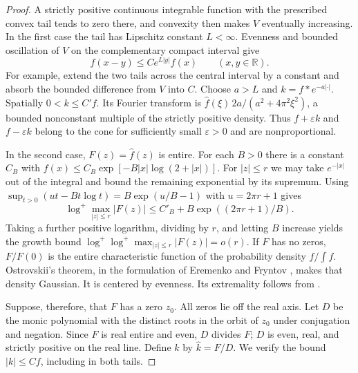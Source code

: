 \documentclass[11pt,a4paper]{article}
\numberwithin{equation}{section}
\begin{document}
\begin{proof}
A strictly positive continuous integrable function with the prescribed convex tail tends to zero there, and convexity then makes $V$ eventually increasing. In the first case the tail has Lipschitz constant $L<\infty$. Evenness and bounded oscillation of $V$ on the complementary compact interval give
\[
 f(x-y)\le C e^{L|y|} f(x)\qquad(x,y\in\mathbb R).
\]
For example, extend the two tails across the central interval by a constant and absorb the bounded difference from $V$ into $C$. Choose $a>L$ and $k=f*e^{-a|\cdot|}$. Spatially $0<k\le C' f$. Its Fourier transform is $\widehat f(\xi)\,2a/(a^2+4\pi^2\xi^2)$, a bounded nonconstant multiple of the strictly positive density. Thus $f+\varepsilon k$ and $f-\varepsilon k$ belong to the cone for sufficiently small $\varepsilon>0$ and are nonproportional.

In the second case, $F(z)=\widehat f(z)$ is entire. For each $B>0$ there is a constant $C_B$ with $f(x)\le C_B\exp[-B|x|\log(2+|x|)]$. For $|z|\le r$ we may take $e^{-|x|}$ out of the integral and bound the remaining exponential by its supremum. Using $\sup_{t>0}(ut-Bt\log t)=B\exp(u/B-1)$ with $u=2\pi r+1$ gives
\[
 \log^+\max_{|z|\le r}|F(z)|\le C'_B+B\exp((2\pi r+1)/B).
\]
Taking a further positive logarithm, dividing by $r$, and letting $B$ increase yields the growth bound $\log^+\log^+\max_{|z|\le r}|F(z)|=o(r)$. If $F$ has no zeros, $F/F(0)$ is the entire characteristic function of the probability density $f/\int f$. Ostrovskii's theorem, in the formulation of Eremenko and Fryntov \cite{EF}, makes that density Gaussian. It is centered by evenness. Its extremality follows from \cite[Sec.~4.2]{JMR2009}.

Suppose, therefore, that $F$ has a zero $z_0$. All zeros lie off the real axis. Let $D$ be the monic polynomial with the distinct roots in the orbit of $z_0$ under conjugation and negation. Since $F$ is real entire and even, $D$ divides $F$; $D$ is even, real, and strictly positive on the real line. Define $k$ by $\widehat k=F/D$. We verify the bound $|k|\le C f$, including in both tails.


\end{proof}
\end{document}
